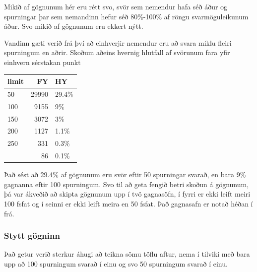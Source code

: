 \documentclass[
  12pt,
]{article}
\begin{document}
Mikið af gögnunum hér eru rétt svo, svör sem nemendur hafa séð áður og spurningar þar sem nemandinn hefur séð 80\%-100\% af röngu svarmöguleikunum áður. Svo mikið af gögnunum eru ekkert nýtt.

Vandinn gæti verið frá því að einhverjir nemendur eru að svara miklu fleiri spurningum en aðrir. Skoðum aðeins hvernig hlutfall af svörunum fara yfir einhvern sérstakan punkt

\begin{table}[H]
\centering
\begin{tabular}{lrl}
\toprule
limit & FY & HY\\
\midrule
50 & 29990 & 29.4\%\\
100 & 9155 & 9\%\\
150 & 3072 & 3\%\\
200 & 1127 & 1.1\%\\
250 & 331 & 0.3\%\\
\addlinespace
300 & 86 & 0.1\%\\
\bottomrule
\end{tabular}
\end{table}

Það sést að 29.4\% af gögnunum eru svör eftir 50 spurningar svarað, en bara 9\% gagnanna eftir 100 spurningum. Svo til að geta fengið betri skoðun á gögnunum, þá var ákveðið að skipta gögnunum upp í tvö gagnasöfn, í fyrri er ekki leift meiri 100 fsfat og í seinni er ekki leift meira en 50 fsfat. Það gagnasafn er notað héðan í frá.

\hypertarget{stytt-guxf6gninn}{%
\subsubsection{Stytt gögninn}\label{stytt-guxf6gninn}}

Það getur verið sterkur áhugi að teikna sömu töflu aftur, nema í tilviki með bara upp að 100 spurningum svarað í einu og svo 50 spurningum svarað í einu.
\end{document}
